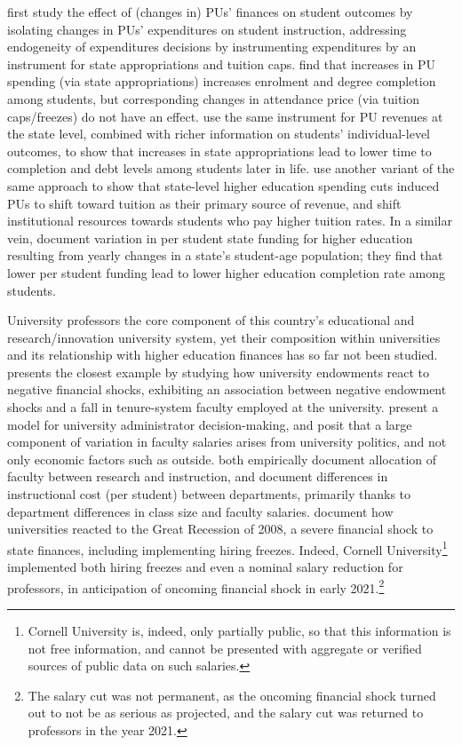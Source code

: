 \documentclass[notitlepage,12pt]{article}
\begin{document}
\cite{NBERw23736} first study the effect of (changes in) PUs' finances on student outcomes by isolating changes in PUs' expenditures on student instruction, addressing endogeneity of expenditures decisions by instrumenting expenditures by an instrument for state appropriations and tuition caps.
\cite{NBERw23736} find that increases in PU spending (via state appropriations) increases enrolment and degree completion among students, but corresponding changes in attendance price (via tuition caps/freezes) do not have an effect.
\cite{chakrabarti2018effect,NBERw27885} use the same instrument for PU revenues at the state level, combined with richer information on students' individual-level outcomes, to show that increases in state appropriations lead to lower time to completion and debt levels among students later in life.
\cite{bound2019public} use another variant of the same approach to show that state-level higher education spending cuts induced PUs to shift toward tuition as their primary source of revenue, and shift institutional resources towards students who pay higher tuition rates.
In a similar vein, \cite{bound2007cohort} document variation in per student state funding for higher education resulting from yearly changes in a state's student-age population; they find that lower per student funding lead to lower higher education completion rate among students.

University professors the core component of this country's educational and research/innovation university system, yet their composition within universities and its relationship with higher education finances has so far not been studied.
\cite{brown2014endowment} presents the closest example by studying how university endowments react to negative financial shocks, exhibiting an association between negative endowment shocks and a fall in tenure-system faculty employed at the university.
\cite{abe2015implications} present a model for university administrator decision-making, and posit that a large component of variation in faculty salaries arises from university politics, and not only economic factors such as outside.
\cite{johnson2009jep,NBERc13879} both empirically document allocation of faculty between research and instruction, and \cite{hemelt2021math} document differences in instructional cost (per student) between departments, primarily thanks to department differences in class size and faculty salaries.
\cite{turner2014impact} document how universities reacted to the Great Recession of 2008, a severe financial shock to state finances, including implementing hiring freezes.
Indeed, Cornell University\footnote{
    Cornell University is, indeed, only partially public, so that this information is not free information, and cannot be presented with aggregate or verified sources of public data on such salaries.
} implemented both hiring freezes and even a nominal salary reduction for professors, in anticipation of oncoming financial shock in early 2021.\footnote{
    The salary cut was not permanent, as the oncoming financial shock turned out to not be as serious as projected, and the salary cut was returned to professors in the year 2021.
}
\end{document}
